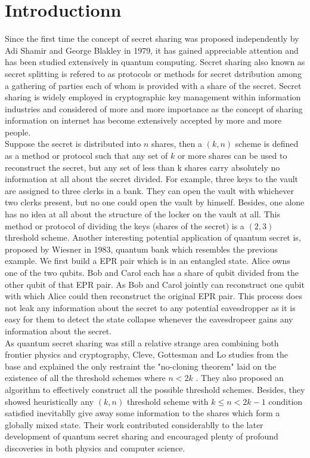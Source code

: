 \documentclass[12pt]{article}
\begin{document}
\section{Introductionn}
Since the first time the concept of secret sharing was proposed independently by Adi Shamir\cite{Shamir} and George Blakley\cite{Blakley} in 1979, it has gained appreciable attention and has been studied extensively in quantum computing.
	Secret sharing also known as secret splitting is refered to as protocols or methods for secret dstribution among a gathering of parties each of whom is provided with a share of the secret. 
	Secret sharing is widely employed in cryptographic key management within information industries and considered of more and more importance as the concept of sharing information on internet has become extensively accepted by more and more people.
	\\
	Suppose the secret is distributed into $n$ shares, then a $(k,n)$ scheme is defined as a method or protocol such that any set of $k$ or more shares can be used to reconstruct the secret, but any set of less than k shares carry absolutely no information at all about the secret divided. 
	For example, three keys to the vault are assigned to three clerks in a bank. 
	They can open the vault with whichever two clerks present, but no one could open the vault by himself. 
	Besides, one alone has no idea at all about the structure of the locker on the vault at all. 
	This method or protocol of dividing the keys (shares of the secret) is a $(2,3)$ threshold scheme.
	Another interesting potential application of quantum secret is, proposed by Wiesner\cite{Wiesner} in 1983, quantum bank which resembles the previous example.
	We first build a EPR pair which is in an entangled state. Alice owns one of the two qubits. Bob and Carol each has a share of qubit divided from the other qubit of that EPR pair. As Bob and Carol jointly can reconstruct one qubit with which Alice could then reconstruct the original EPR pair. This process does not leak any information about the secret to any potential eavesdropper as it is easy for them to detect the state collapse whenever the eavesdropeer gains any information about the secret.
	\\
	As quantum secret sharing was still a relative strange area combining both frontier physics and cryptography, Cleve, Gottesman and Lo studies from the base and explained the only restraint the "no-cloning theorem" laid on the existence of all the threshold schemes where $n < 2k$ \cite{review}. They also proposed an algorithm to effectively construct all the possible threshold schemes. Besides, they showed heuristically any $(k, n)$ threshold scheme with $k \leq n < 2k-1$ condition satisfied inevitablly give away some information to the shares which form a globally mixed state. Their work contributed considerablly to the later development of quantum secret sharing and encouraged plenty of profound discoveries in both physics and computer science.\\
\end{document}

